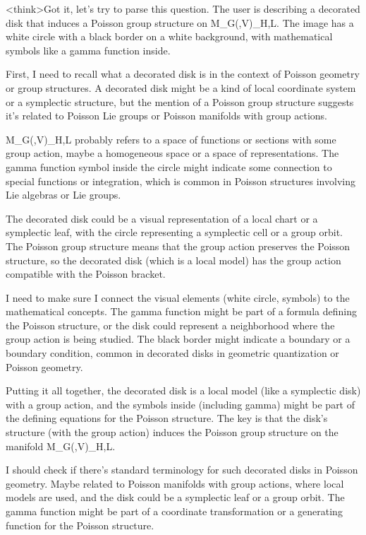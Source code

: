 <think>Got it, let's try to parse this question. The user is describing a decorated disk that induces a Poisson group structure on M_G(,V)_H,L. The image has a white circle with a black border on a white background, with mathematical symbols like a gamma function inside. 

First, I need to recall what a decorated disk is in the context of Poisson geometry or group structures. A decorated disk might be a kind of local coordinate system or a symplectic structure, but the mention of a Poisson group structure suggests it's related to Poisson Lie groups or Poisson manifolds with group actions. 

M_G(,V)_H,L probably refers to a space of functions or sections with some group action, maybe a homogeneous space or a space of representations. The gamma function symbol inside the circle might indicate some connection to special functions or integration, which is common in Poisson structures involving Lie algebras or Lie groups. 

The decorated disk could be a visual representation of a local chart or a symplectic leaf, with the circle representing a symplectic cell or a group orbit. The Poisson group structure means that the group action preserves the Poisson structure, so the decorated disk (which is a local model) has the group action compatible with the Poisson bracket. 

I need to make sure I connect the visual elements (white circle, symbols) to the mathematical concepts. The gamma function might be part of a formula defining the Poisson structure, or the disk could represent a neighborhood where the group action is being studied. The black border might indicate a boundary or a boundary condition, common in decorated disks in geometric quantization or Poisson geometry. 

Putting it all together, the decorated disk is a local model (like a symplectic disk) with a group action, and the symbols inside (including gamma) might be part of the defining equations for the Poisson structure. The key is that the disk's structure (with the group action) induces the Poisson group structure on the manifold M_G(,V)_H,L. 

I should check if there's standard terminology for such decorated disks in Poisson geometry. Maybe related to Poisson manifolds with group actions, where local models are used, and the disk could be a symplectic leaf or a group orbit. The gamma function might be part of a coordinate transformation or a generating function for the Poisson structure. 

